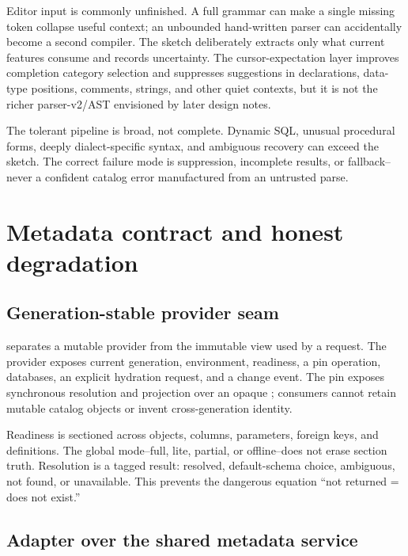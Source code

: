 \documentclass[11pt]{article}
\newcommand{\code}[1]{\texttt{\detokenize{#1}}}
\begin{document}
Editor input is commonly unfinished. A full grammar can make a single missing token collapse useful context; an unbounded hand-written parser can accidentally become a second compiler. The sketch deliberately extracts only what current features consume and records uncertainty. The cursor-expectation layer improves completion category selection and suppresses suggestions in declarations, data-type positions, comments, strings, and other quiet contexts, but it is not the richer parser-v2/AST envisioned by later design notes.

\begin{warningbox}[title={Semantic ceiling}]
The tolerant pipeline is broad, not complete. Dynamic SQL, unusual procedural forms, deeply dialect-specific syntax, and ambiguous recovery can exceed the sketch. The correct failure mode is suppression, incomplete results, or fallback--never a confident catalog error manufactured from an untrusted parse.
\end{warningbox}

\section{Metadata contract and honest degradation}

\subsection{Generation-stable provider seam}

 separates a mutable provider from the immutable view used by a request. The provider exposes current generation, environment, readiness, a pin operation, databases, an explicit hydration request, and a change event. The pin exposes synchronous resolution and projection over an opaque \code{LangObjectRef}; consumers cannot retain mutable catalog objects or invent cross-generation identity.

Readiness is sectioned across objects, columns, parameters, foreign keys, and definitions. The global mode--full, lite, partial, or offline--does not erase section truth. Resolution is a tagged result: resolved, default-schema choice, ambiguous, not found, or unavailable. This prevents the dangerous equation ``not returned = does not exist.''

\subsection{Adapter over the shared metadata service}
\end{document}
